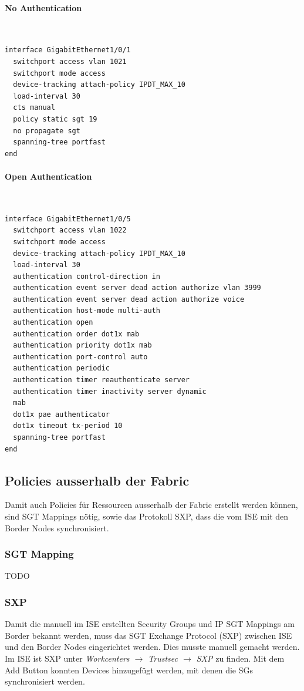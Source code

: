 \paragraph{No Authentication}
~\\
\begin{lstlisting}[language=bash]
interface GigabitEthernet1/0/1
  switchport access vlan 1021
  switchport mode access
  device-tracking attach-policy IPDT_MAX_10
  load-interval 30
  cts manual 
  policy static sgt 19
  no propagate sgt
  spanning-tree portfast
end
\end{lstlisting}
\paragraph{Open Authentication}
~\\
\begin{lstlisting}[language=bash]
interface GigabitEthernet1/0/5
  switchport access vlan 1022
  switchport mode access
  device-tracking attach-policy IPDT_MAX_10
  load-interval 30
  authentication control-direction in
  authentication event server dead action authorize vlan 3999
  authentication event server dead action authorize voice
  authentication host-mode multi-auth
  authentication open
  authentication order dot1x mab
  authentication priority dot1x mab
  authentication port-control auto
  authentication periodic
  authentication timer reauthenticate server
  authentication timer inactivity server dynamic
  mab
  dot1x pae authenticator
  dot1x timeout tx-period 10
  spanning-tree portfast
end
\end{lstlisting}

\subsection{Policies ausserhalb der Fabric}

Damit auch Policies für Ressourcen ausserhalb der Fabric erstellt werden können, sind SGT Mappings nötig, sowie das Protokoll SXP, dass die vom ISE mit den Border Nodes synchronisiert.

\subsubsection{SGT Mapping}
TODO
\subsubsection{SXP}

Damit die manuell im ISE erstellten Security Groups und IP SGT Mappings am Border bekannt werden, muss das SGT Exchange Protocol (SXP) zwischen ISE und den Border Nodes eingerichtet werden. Dies musste manuell gemacht werden.
Im ISE ist SXP unter \textit{Workcenters $\rightarrow$ Trustsec $\rightarrow$ SXP} zu finden. Mit dem Add Button konnten Devices hinzugefügt werden, mit denen die SGs synchronisiert werden.

